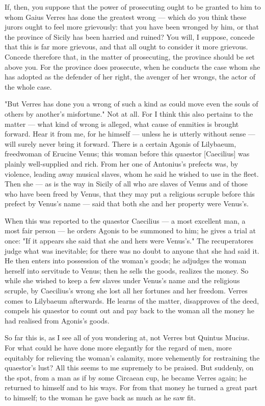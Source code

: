  If, then, you suppose that the power of prosecuting ought to be granted to him to whom Gaius Verres has done the greatest wrong --- which do you think these jurors ought to feel more grievously: that you have been wronged by him, or that the province of Sicily has been harried and ruined? You will, I suppose, concede that this is far more grievous, and that all ought to consider it more grievous. Concede therefore that, in the matter of prosecuting, the province should be set above you. For the province does prosecute, when he conducts the case whom she has adopted as the defender of her right, the avenger of her wrongs, the actor of the whole case.

 "But Verres has done you a wrong of such a kind as could move even the souls of others by another's misfortune." Not at all. For I think this also pertains to the matter --- what kind of wrong is alleged, what cause of enmities is brought forward. Hear it from me, for he himself --- unless he is utterly without sense --- will surely never bring it forward. There is a certain Agonis of Lilybaeum, freedwoman of Erucine Venus; this woman before this quaestor [Caecilius] was plainly well-supplied and rich. From her one of Antonius's prefects was, by violence, leading away musical slaves, whom he said he wished to use in the fleet. Then she --- as is the way in Sicily of all who are slaves of Venus and of those who have been freed by Venus, that they may put a religious scruple before this prefect by Venus's name --- said that both she and her property were Venus's.

 When this was reported to the quaestor Caecilius --- a most excellent man, a most fair person --- he orders Agonis to be summoned to him; he gives a trial at once: "If it appears she said that she and hers were Venus's." The recuperatores judge what was inevitable; for there was no doubt to anyone that she had said it. He then enters into possession of the woman's goods; he adjudges the woman herself into servitude to Venus; then he sells the goods, realizes the money. So while she wished to keep a few slaves under Venus's name and the religious scruple, by Caecilius's wrong she lost all her fortunes and her freedom. Verres comes to Lilybaeum afterwards. He learns of the matter, disapproves of the deed, compels his quaestor to count out and pay back to the woman all the money he had realised from Agonis's goods.

 So far this is, as I see all of you wondering at, not Verres but Quintus Mucius. For what could he have done more elegantly for the regard of men, more equitably for relieving the woman's calamity, more vehemently for restraining the quaestor's lust? All this seems to me supremely to be praised. But suddenly, on the spot, from a man as if by some Circaean cup, he became Verres again; he returned to himself and to his ways. For from that money he turned a great part to himself; to the woman he gave back as much as he saw fit.

